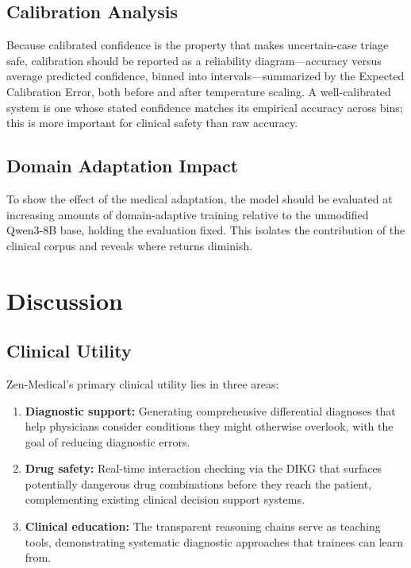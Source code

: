 \documentclass[11pt,a4paper]{article}
\begin{document}
\subsection{Calibration Analysis}

Because calibrated confidence is the property that makes uncertain-case triage safe, calibration should be reported as a reliability diagram---accuracy versus average predicted confidence, binned into intervals---summarized by the Expected Calibration Error, both before and after temperature scaling. A well-calibrated system is one whose stated confidence matches its empirical accuracy across bins; this is more important for clinical safety than raw accuracy.

\subsection{Domain Adaptation Impact}

To show the effect of the medical adaptation, the model should be evaluated at increasing amounts of domain-adaptive training relative to the unmodified Qwen3-8B base, holding the evaluation fixed. This isolates the contribution of the clinical corpus and reveals where returns diminish.

\section{Discussion}
\label{sec:discussion}

\subsection{Clinical Utility}

Zen-Medical's primary clinical utility lies in three areas:
\begin{enumerate}
    \item \textbf{Diagnostic support:} Generating comprehensive differential diagnoses that help physicians consider conditions they might otherwise overlook, with the goal of reducing diagnostic errors.
    \item \textbf{Drug safety:} Real-time interaction checking via the DIKG that surfaces potentially dangerous drug combinations before they reach the patient, complementing existing clinical decision support systems.
    \item \textbf{Clinical education:} The transparent reasoning chains serve as teaching tools, demonstrating systematic diagnostic approaches that trainees can learn from.
\end{enumerate}
\end{document}
